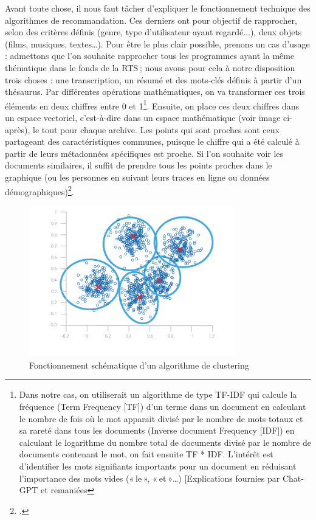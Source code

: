 Avant toute chose, il nous faut tâcher d’expliquer le fonctionnement technique des algorithmes de recommandation. Ces derniers ont pour objectif de rapprocher, selon des critères définis (genre, type d'utilisateur ayant regardé...), deux objets (films, musiques, textes…). Pour être le plus clair possible, prenons un cas d’usage : admettons que l'on souhaite rapprocher tous les programmes ayant la même thématique dans le fonds de la RTS ; nous avons pour cela à notre disposition trois choses : une transcription, un résumé et des mots-clés définis à partir d’un thésaurus. Par différentes opérations mathématiques, on va transformer ces trois éléments en deux chiffres entre 0 et 1\footnote{  Dans notre cas, on utiliserait un algorithme de type TF-IDF qui calcule la fréquence (Term Frequency [TF]) d’un terme dans un document en calculant le nombre de fois où le mot apparait divisé par le nombre de mots totaux et sa rareté dans tous les documents (Inverse document Frequency [IDF]) en calculant le logarithme du nombre total de documents divisé par le nombre de documents contenant le mot, on fait ensuite TF * IDF. L’intérêt est d’identifier les mots signifiants importants pour un document en réduisant l’importance des mots vides (« le », « et »…) [Explications fournies par Chat-GPT et remaniées}. Ensuite, on place ces deux chiffres dans un espace vectoriel, c’est-à-dire dans un espace mathématique (voir image ci-après), le tout pour chaque archive. Les points qui sont proches sont ceux partageant des caractéristiques communes, puisque le chiffre qui a été calculé à partir de leurs métadonnées spécifiques est proche. Si l'on souhaite voir les documents similaires, il suffit de prendre tous les points proches dans le graphique (ou les personnes en suivant leurs traces en ligne ou données démographiques)\footcite{zotero-216}.


\begin{figure}[h!]
	\centering
	\includegraphics[width=0.8\textwidth]{images/image10.png}
	\caption{Fonctionnement schématique d'un algorithme de clustering}
	\label{fig:image10}
\end{figure}

